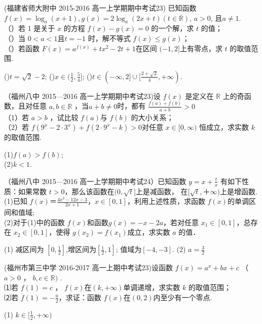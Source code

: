 \item (福建省师大附中 2015-2016 高一上学期期中考试23) 已知函数 $f ( x ) =\log_a ( x+ 1), g ( x )= 2 \log_a ( 2 x+ t )(t\in \mathbb{R})$, $a> 0$, 且$a\neq 1$.\\
（）若 1 是关于 $x$ 的方程 $f ( x) -g ( x) =0$ 的一个解，求 $t$ 的值；\\
（）当 $0< a< 1$且$t=-1$ 时，解不等式 $f ( x)\leq g ( x) $；\\
（）若函数 $F ( x)= a^{f ( x ) }+ tx^2- 2t+ 1 $在区间 $(-1,2]$上有零点，求 $t$ 的取值范围.
\begin{answer}
()$t=\sqrt{2}-2$;
()$x\in(\frac12,\frac54]$;
()$t\in(-\infty,2]\cup [\frac{2+\sqrt{2}}{4},+\infty)$.
\end{answer}

\item
（福州八中 2015—2016 高一上学期期中考试23)设 $f (x )$ 是定义在 $\mathbb{R}$ 上的奇函数，且对任意 $a,b\in \mathbb{R}$ ，当$a+b\neq0$时，都有 $\frac{f(a)+f(b)}{a+b}>0$\\
（1）若 $a> b$ ，试比较 $f (a ) $与 $f (b)$ 的大小关系；\\
（2）若 $f (9^x- 2\cdot 3^x )+ f ( 2\cdot 9^x-k )> 0 $对任意 $x\in[0,\infty )$ 恒成立，求实数 $k$ 的取值范围.
\begin{answer}
(1)$f(a)>f(b)$;\\
(2)$k<1$.\\
\end{answer}

（福州八中 2015—2016 高一上学期期中考试24）已知函数 $y=x+\frac tx$ 有如下性质：如果常数 $t>0$，那么该函数在$(0,\sqrt t]$上是减函数， 在$[\sqrt t, ＋\infty)$上是增函数.\\
(1)已知 $f(x)＝\frac{4x^2-12x-3}{2x+1} $，$x\in[0,1]$，利用上述性质，求函数 $f(x)$的单调区间和值域;\\
(2)对于(1)中的函数 $f(x)$和函数$g(x)=-x-2a$，若对任意 $x_1 \in[0,1]$，总存在 $x_2\in[0,1]$，使得 $g(x_2 )=f(x_1 ) $成立，求实数 $a$ 的值．
\begin{answers}
(1) 减区间为 $[0,\frac12] $,增区间为$[\frac12,1] $; 值域为$[-4,-3] $.
(2) $a=\frac32 $
\end{answers}

(福州市第三中学 2016-2017 高一上期中考试23)设函数 $f (x)=a^x+ bx +c$ （ $a> 0$ ， $b, c\in \mathbb{R})$ . \\
⑴若 $f (1)= c$ ， $f (x)$在$( k,+\infty)$单调递增，求实数 $k$ 的取值范围；\\
 ⑵若 $f( 1)=-\frac a2$，求证：函数 $f (x) $在$( 0,2) $内至少有一个零点.
 \begin{answers}
(1) $k\in [\frac12,+\infty) $
\end{answers} 


